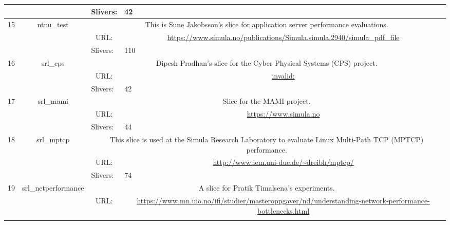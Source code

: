 \begin{small}
\begin{center}
\begin{longtable}{|c|c|c|c|}
  &  & \multicolumn{1}{|l|}{Slivers:} & \multicolumn{1}{|l|}{42} \\ \hline
 \multirow{3}{*}{15} & \multirow{3}{*}{\index{ntnu\_test}\index{Slice!ntnu\_test}ntnu\_test} & \multicolumn{2}{|p{30em}|}{This is Sune Jakobsson's slice for application server performance evaluations.} \\* \cline{3-3}\cline{4-4}
  &  & \multicolumn{1}{|p{5em}|}{URL:} & \multicolumn{1}{|p{22.5em}|}{\url{https://www.simula.no/publications/Simula.simula.2940/simula_pdf_file}} \\* \cline{3-3}\cline{4-4}
  &  & \multicolumn{1}{|l|}{Slivers:} & \multicolumn{1}{|l|}{110} \\ \hline
 \multirow{3}{*}{16} & \multirow{3}{*}{\index{srl\_cps}\index{Slice!srl\_cps}srl\_cps} & \multicolumn{2}{|p{30em}|}{Dipesh Pradhan's slice for the Cyber Physical Systems (CPS) project.} \\* \cline{3-3}\cline{4-4}
  &  & \multicolumn{1}{|p{5em}|}{URL:} & \multicolumn{1}{|p{22.5em}|}{\url{invalid:}} \\* \cline{3-3}\cline{4-4}
  &  & \multicolumn{1}{|l|}{Slivers:} & \multicolumn{1}{|l|}{42} \\ \hline
 \multirow{3}{*}{17} & \multirow{3}{*}{\index{srl\_mami}\index{Slice!srl\_mami}srl\_mami} & \multicolumn{2}{|p{30em}|}{Slice for the MAMI project.} \\* \cline{3-3}\cline{4-4}
  &  & \multicolumn{1}{|p{5em}|}{URL:} & \multicolumn{1}{|p{22.5em}|}{\url{https://www.simula.no}} \\* \cline{3-3}\cline{4-4}
  &  & \multicolumn{1}{|l|}{Slivers:} & \multicolumn{1}{|l|}{44} \\ \hline
 \multirow{3}{*}{18} & \multirow{3}{*}{\index{srl\_mptcp}\index{Slice!srl\_mptcp}srl\_mptcp} & \multicolumn{2}{|p{30em}|}{This slice is used at the Simula Research Laboratory to evaluate Linux Multi-Path TCP (MPTCP) performance.} \\* \cline{3-3}\cline{4-4}
  &  & \multicolumn{1}{|p{5em}|}{URL:} & \multicolumn{1}{|p{22.5em}|}{\url{http://www.iem.uni-due.de/~dreibh/mptcp/}} \\* \cline{3-3}\cline{4-4}
  &  & \multicolumn{1}{|l|}{Slivers:} & \multicolumn{1}{|l|}{74} \\ \hline
 \multirow{3}{*}{19} & \multirow{3}{*}{\index{srl\_netperformance}\index{Slice!srl\_netperformance}srl\_netperformance} & \multicolumn{2}{|p{30em}|}{A slice for Pratik Timalsena's experiments.} \\* \cline{3-3}\cline{4-4}
  &  & \multicolumn{1}{|p{5em}|}{URL:} & \multicolumn{1}{|p{22.5em}|}{\url{https://www.mn.uio.no/ifi/studier/masteroppgaver/nd/understanding-network-performance-bottlenecks.html}} \\* \cline{3-3}\cline{4-4}

\end{longtable}
\end{center}
\end{small}
